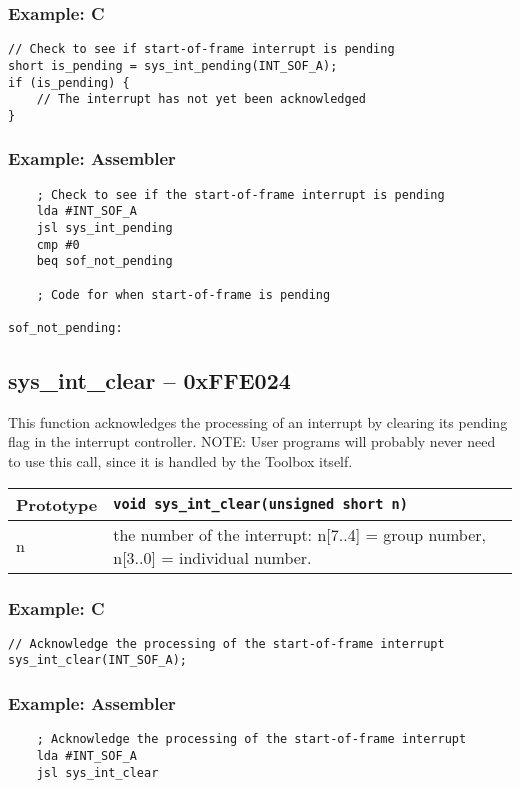 \subsubsection*{Example: C}
\begin{lstlisting}
// Check to see if start-of-frame interrupt is pending
short is_pending = sys_int_pending(INT_SOF_A);
if (is_pending) {
	// The interrupt has not yet been acknowledged
}
\end{lstlisting}

\subsubsection*{Example: Assembler}
\begin{verbatim}
    ; Check to see if the start-of-frame interrupt is pending
    lda #INT_SOF_A
    jsl sys_int_pending
    cmp #0
    beq sof_not_pending

    ; Code for when start-of-frame is pending

sof_not_pending:
\end{verbatim}

\subsection*{sys\_int\_clear -- 0xFFE024}
This function acknowledges the processing of an interrupt by clearing its pending flag in the interrupt controller.
NOTE: User programs will probably never need to use this call, since it is handled by the Toolbox itself.

\bigskip

\begin{tabular}{|l||l|} \hline
Prototype & \lstinline!void sys_int_clear(unsigned short n)! \\ \hline
n & the number of the interrupt: n[7..4] = group number, n[3..0] = individual number. \\ \hline
\end{tabular}

\subsubsection*{Example: C}
\begin{lstlisting}
// Acknowledge the processing of the start-of-frame interrupt
sys_int_clear(INT_SOF_A);
\end{lstlisting}

\subsubsection*{Example: Assembler}
\begin{verbatim}
    ; Acknowledge the processing of the start-of-frame interrupt
    lda #INT_SOF_A
    jsl sys_int_clear
\end{verbatim}

